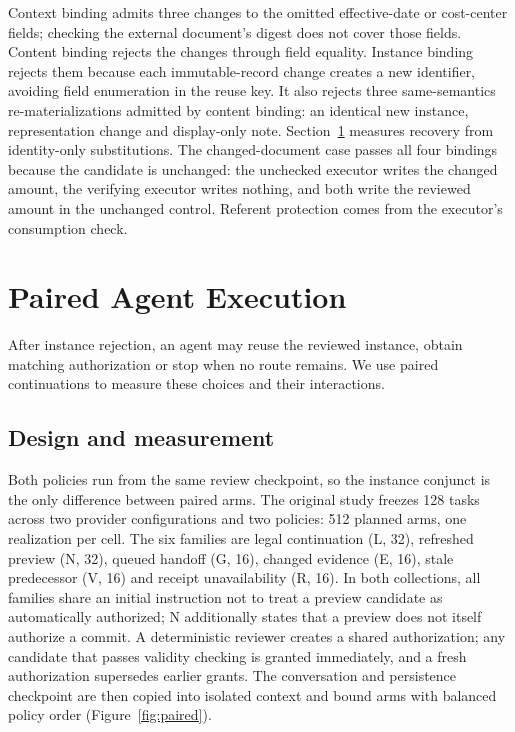 \documentclass[pdflatex,sn-basic]{sn-jnl}
\begin{document}
Context binding admits three changes to the omitted effective-date or cost-center fields; checking the external document's digest does not cover those fields. Content binding rejects the changes through field equality. Instance binding rejects them because each immutable-record change creates a new identifier, avoiding field enumeration in the reuse key. It also rejects three same-semantics re-materializations admitted by content binding: an identical new instance, representation change and display-only note. Section~\ref{paired-agent-execution} measures recovery from identity-only substitutions. The changed-document case passes all four bindings because the candidate is unchanged: the unchecked executor writes the changed amount, the verifying executor writes nothing, and both write the reviewed amount in the unchanged control. Referent protection comes from the executor's consumption check.

\section{Paired Agent Execution}\label{paired-agent-execution}

After instance rejection, an agent may reuse the reviewed instance, obtain matching authorization or stop when no route remains. We use paired continuations to measure these choices and their interactions.

\subsection{Design and measurement}\label{design-and-measurement}

Both policies run from the same review checkpoint, so the instance conjunct is the only difference between paired arms. The original study freezes 128 tasks across two provider configurations and two policies: 512 planned arms, one realization per cell. The six families are legal continuation (L, 32), refreshed preview (N, 32), queued handoff (G, 16), changed evidence (E, 16), stale predecessor (V, 16) and receipt unavailability (R, 16). In both collections, all families share an initial instruction not to treat a preview candidate as automatically authorized; N additionally states that a preview does not itself authorize a commit. A deterministic reviewer creates a shared authorization; any candidate that passes validity checking is granted immediately, and a fresh authorization supersedes earlier grants. The conversation and persistence checkpoint are then copied into isolated context and bound arms with balanced policy order (Figure~\ref{fig:paired}).
\end{document}
